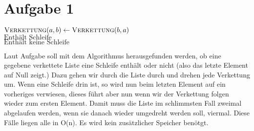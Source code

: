 \documentclass{article}
\begin{document}
\section{Aufgabe 1}
\begin{algorithm}
\begin{algorithmic}

	\State $\Call{Verkettung}{a, b} \gets \Call{Verkettung}{b,a}$
	 \\
	\Return $\text{Enthält Schleife}$
	\Else \\
	\Return $\text{Enthält keine Schleife}$
	\EndIf
\EndFor
\EndFunction
\end{algorithmic}
\end{algorithm}
Laut Aufgabe soll mit dem Algorithmus herausgefunden werden, ob eine 
gegebene verkettete Liste eine Schleife enthält oder nicht (also das 
letzte Element auf Null zeigt.) Dazu gehen wir durch die Liste durch 
und drehen jede Verkettung um. Wenn eine Schleife drin ist, so wird nun 
beim letzten Element auf ein vorheriges verwiesen, dieses führt aber 
nun wenn wir der Verkettung folgen wieder zum ersten Element. Damit 
muss die Liste im schlimmsten Fall zweimal abgelaufen werden, wenn sie 
danach wieder umgedreht werden soll, viermal. Diese Fälle liegen alle 
in O(n). Es wird kein zusätzlicher Speicher benötgt.
\end{document}
